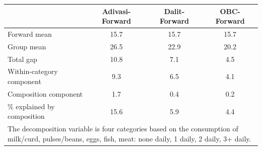 \begin{tabular}{l*{3}{c}}
\hline\hline
            &\multicolumn{1}{c}{Adivasi-Forward}&\multicolumn{1}{c}{Dalit-Forward}&\multicolumn{1}{c}{OBC-Forward}\\
\hline
\hline
Forward mean&        15.7&        15.7&        15.7\\
Group mean  &        26.5&        22.9&        20.2\\
Total gap   &        10.8&         7.1&         4.5\\
Within-category component&         9.3&         6.5&         4.1\\
Composition component&         1.7&         0.4&         0.2\\
\% explained by composition&        15.6&         5.9&         4.4\\
\hline\hline
\multicolumn{4}{l}{\footnotesize \parbox[t]{0.95\linewidth}{The decomposition variable is four categories based on the consumption of milk/curd, pulses/beans, eggs, fish, meat: none daily, 1 daily, 2 daily, 3+ daily.}}\\
\end{tabular}
